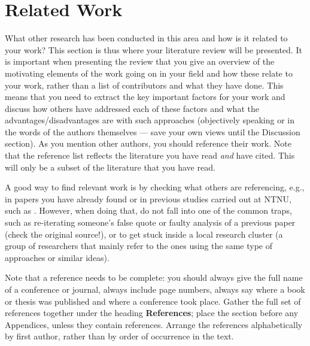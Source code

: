 \section{Related Work}
\label{sec:related_work}

What other research has been conducted in this area and how is it related to your work? 
This section is thus where your literature review will be presented. It is important when presenting the review 
that you give an overview of the motivating elements of the work going on in your field and how these relate to your work, 
rather than a list of contributors and what they have done. 
This means that you need to extract the key important factors for your work and discuss how others have addressed 
each of these factors and what the advantages/disadvantages are with such approaches 
(objectively speaking or in the words of the authors themselves --- save your own views until the Discussion section). 
As you mention other authors, you should reference their work.
Note that the reference list reflects the literature you have read \textit{and\/} have cited. 
This will only be a subset of the literature that you have read.

A good way to find relevant work is by checking what others are referencing, e.g., in papers you have already found
or in previous studies carried out at NTNU, such as \citep{Berg;Gopinathan:17}.
However, when doing that,
do not fall into one of the common traps, such as re-iterating someone's false quote or faulty analysis of
a previous paper (check the original source!), or to get stuck inside a local research cluster (a group of
researchers that mainly refer to the ones using the same type of approaches or similar ideas).  

Note that a reference needs to be complete: you should always give the full name of a conference or journal,
always include page numbers, always say where a book or thesis was published and where a conference took place. 
Gather the full set of references together under the heading \textbf{References}; 
place the section before any Appendices, unless they contain references. 
Arrange the references alphabetically by first author, rather than by order of occurrence in the text.